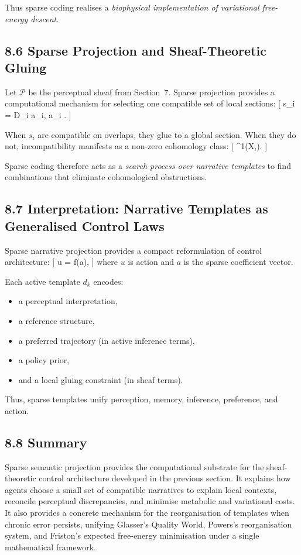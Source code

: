 \documentclass[11pt,a4paper,twoside]{article}
\begin{document}
Thus sparse coding realises a \emph{biophysical implementation of variational free-energy descent}.

\subsection{8.6 Sparse Projection and Sheaf-Theoretic Gluing}

Let $\mathcal{P}$ be the perceptual sheaf from Section~7. Sparse projection provides a computational mechanism for selecting one compatible set of local sections:
[
s_i = D_i a_i,
\qquad a_i .
]

When ${s_i}$ are compatible on overlaps, they glue to a global section. When they do not, incompatibility manifests as a non-zero cohomology class:
[
^1(X,).
]

Sparse coding therefore acts as a \emph{search process over narrative templates} to find combinations that eliminate cohomological obstructions.

\subsection{8.7 Interpretation: Narrative Templates as Generalised Control Laws}

Sparse narrative projection provides a compact reformulation of control architecture:
[
u = f(a),
]
where $u$ is action and $a$ is the sparse coefficient vector.

Each active template $d_k$ encodes:
\begin{itemize}
\item a perceptual interpretation,
\item a reference structure,
\item a preferred trajectory (in active inference terms),
\item a policy prior,
\item and a local gluing constraint (in sheaf terms).
\end{itemize}

Thus, sparse templates unify perception, memory, inference, preference, and action.

\subsection{8.8 Summary}

Sparse semantic projection provides the computational substrate for the sheaf-theoretic control architecture developed in the previous section. It explains how agents choose a small set of compatible narratives to explain local contexts, reconcile perceptual discrepancies, and minimise metabolic and variational costs. It also provides a concrete mechanism for the reorganisation of templates when chronic error persists, unifying Glasser’s Quality World, Powers’s reorganisation system, and Friston’s expected free-energy minimisation under a single mathematical framework.
\end{document}
